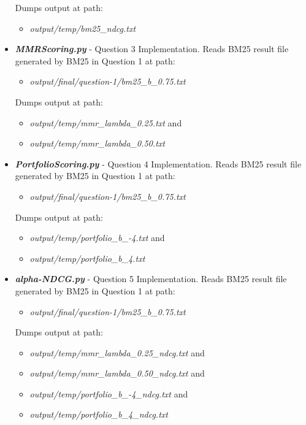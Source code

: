 \documentclass{article} %
\begin{document}
\begin{itemize}
\begin{itemize}
    \end{itemize}
    Dumps output at path: 
    \begin{itemize}
        \item \textit{output/temp/bm25\_ndcg.txt}
    \end{itemize}
    \item \textit{\textbf{MMRScoring.py}} - Question 3 Implementation. Reads BM25 result file generated by BM25 in Question 1 at path:
    \begin{itemize}
        \item \textit{output/final/question-1/bm25\_b\_0.75.txt}
    \end{itemize}
    Dumps output at path:
    \begin{itemize}
        \item \textit{output/temp/mmr\_lambda\_0.25.txt} and
        \item \textit{output/temp/mmr\_lambda\_0.50.txt}
    \end{itemize}
    \item \textit{\textbf{PortfolioScoring.py}} - Question 4 Implementation. Reads BM25 result file generated by BM25 in Question 1 at path:
    \begin{itemize}
        \item \textit{output/final/question-1/bm25\_b\_0.75.txt}
    \end{itemize}
    Dumps output at path:
    \begin{itemize}
        \item \textit{output/temp/portfolio\_b\_-4.txt} and
        \item \textit{output/temp/portfolio\_b\_4.txt}
    \end{itemize}
    \item \textit{\textbf{alpha-NDCG.py}} - Question 5 Implementation. Reads BM25 result file generated by BM25 in Question 1 at path:
    \begin{itemize}
        \item \textit{output/final/question-1/bm25\_b\_0.75.txt}
    \end{itemize}
    Dumps output at path:
    \begin{itemize}
        \item \textit{output/temp/mmr\_lambda\_0.25\_ndcg.txt} and
        \item \textit{output/temp/mmr\_lambda\_0.50\_ndcg.txt} and
        \item \textit{output/temp/portfolio\_b\_-4\_ndcg.txt} and
        \item \textit{output/temp/portfolio\_b\_4\_ndcg.txt}
    \end{itemize}
\end{itemize}
\end{document}
